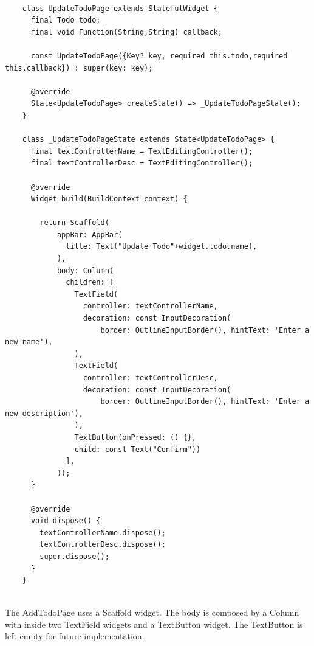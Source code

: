 	 \mbox{}
	\begin{verbatim}
	
	class UpdateTodoPage extends StatefulWidget {
	  final Todo todo;
	  final void Function(String,String) callback;
	
	  const UpdateTodoPage({Key? key, required this.todo,required this.callback}) : super(key: key);
	
	  @override
	  State<UpdateTodoPage> createState() => _UpdateTodoPageState();
	}
	
	class _UpdateTodoPageState extends State<UpdateTodoPage> {
	  final textControllerName = TextEditingController();
	  final textControllerDesc = TextEditingController();
	
	  @override
	  Widget build(BuildContext context) {
	
	    return Scaffold(
	        appBar: AppBar(
	          title: Text("Update Todo"+widget.todo.name),
	        ),
	        body: Column(
	          children: [
	            TextField(
	              controller: textControllerName,
	              decoration: const InputDecoration(
	                  border: OutlineInputBorder(), hintText: 'Enter a new name'),
	            ),
	            TextField(
	              controller: textControllerDesc,
	              decoration: const InputDecoration(
	                  border: OutlineInputBorder(), hintText: 'Enter a new description'),
	            ),
	            TextButton(onPressed: () {},
	            child: const Text("Confirm"))
	          ],
	        ));
	  }
	
	  @override
	  void dispose() {
	    textControllerName.dispose();
	    textControllerDesc.dispose();
	    super.dispose();
	  }
	}
	
	\end{verbatim}
	
	\mbox{}
	
	
	
	The AddTodoPage uses a Scaffold widget. The body is composed by a Column with inside two TextField widgets and a TextButton widget. The TextButton is left empty for future implementation.
	
	\mbox{}\\
	
